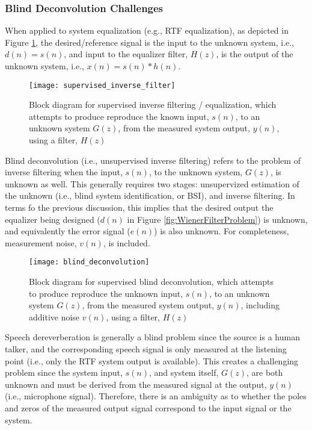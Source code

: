 \subsubsection{Blind Deconvolution Challenges}

When applied to system equalization (e.g., RTF equalization), as depicted in Figure \ref{fig:supervised_inverse_filter}, the desired/reference signal is the input to the unknown system, i.e., $d(n)=s(n)$, and input to the equalizer filter, $H(z)$, is the output of the unknown system, i.e., $x(n)=s(n)*h(n)$. 

\begin{figure}[H]
	\texttt{[image: supervised\_inverse\_filter]}
	\centering
	\caption{Block diagram for supervised inverse filtering / equalization, which attempts to produce reproduce the known input, $s(n)$, to an unknown system $G(z)$, from the measured system output, $y(n)$, using a filter, $H(z)$}
	\label{fig:supervised_inverse_filter}
\end{figure}

Blind deconvolution (i.e., unsupervised inverse filtering) refers to the problem of inverse filtering when the input, $s(n)$, to the unknown system, $G(z)$, is unknown as well. This generally requires two stages: unsupervized estimation of the unknown  (i.e., blind system identification, or BSI), and inverse filtering. In terms fo the previous discussion, this implies that the desired output the equalizer being designed ($d(n)$ in Figure \ref{fig:WienerFilterProblem}) is unknown, and equivalently the error signal ($e(n)$) is also unknown. For completeness, measurement noise, $v(n)$, is included.

\begin{figure}[H]
	\texttt{[image: blind\_deconvolution]}
	\centering
	\caption{Block diagram for supervised blind deconvolution, which attempts to produce reproduce the unknown input, $s(n)$, to an unknown system $G(z)$, from the measured system output, $y(n)$, including additive noise $v(n)$, using a filter, $H(z)$}
	\label{fig:blind_deconvolution}
\end{figure}

Speech dereverberation is generally a blind problem since the source is a human talker, and the corresponding speech signal is only measured at the listening point (i.e., only the RTF system output is available). This creates a challenging problem since the system input, $s(n)$, and system itself, $G(z)$, are both unknown and must be derived from the measured signal at the output, $y(n)$ (i.e., microphone signal). Therefore, there is an ambiguity as to whether the poles and zeros of the measured output signal correspond to the input signal or the system.

